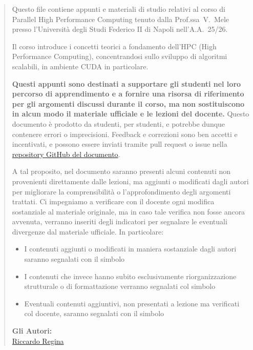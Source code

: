 \begin{abstract}
  Questo file contiene appunti e materiali di studio relativi al corso di Parallel High Performance Computing tenuto dalla Prof.ssa~V.~Mele presso l'Università degli Studi Federico II di Napoli nell'A.A.~25/26.
  
  Il corso introduce i concetti teorici a fondamento dell'HPC (High Performance Computing), concentrandosi sullo sviluppo di algoritmi scalabili, in ambiente CUDA in particolare.

  \textbf{Questi appunti sono destinati a supportare gli studenti nel loro percorso di apprendimento e a fornire una risorsa di riferimento per gli argomenti discussi durante il corso, ma non sostituiscono in alcun modo il materiale ufficiale e le lezioni del docente.}
  Questo documento è prodotto da studenti, per studenti, e potrebbe dunque contenere errori o imprecisioni. Feedback e correzioni sono ben accetti e incentivati, e possono essere inviati tramite pull request o issue nella \href{https://github.com/riccardoregina/HPC-notes}{repository GitHub del documento}.

  A tal proposito, nel documento saranno presenti alcuni contenuti non provenienti direttamente dalle lezioni, ma aggiunti o modificati dagli autori per migliorare la comprensibilità o l'approfondimento degli argomenti trattati.
  Ci impegniamo a verificare con il docente ogni modifica sostanziale al materiale originale, ma in caso tale verifica non fosse ancora avvenuta, verranno inseriti degli indicatori per segnalare le eventuali divergenze dal materiale ufficiale.
  In particolare:
  \begin{itemize}
    \item I contenuti aggiunti o modificati in maniera sostanziale dagli autori saranno segnalati con il simbolo \warningsymbol{}
    \item I contenuti che invece hanno subito esclusivamente riorganizzazione strutturale o di formattazione verranno segnalati col simbolo \infosymbol{}
    \item Eventuali contenuti aggiuntivi, non presentati a lezione ma verificati col docente, saranno segnalati con il simbolo \extrasymbol{}
  \end{itemize}
  
  \begin{flushright}
    \vspace{2cm}
    \textbf{Gli Autori:}\\
    \href{https://github.com/riccardoregina}{Riccardo Regina} \\
  \end{flushright}
\end{abstract}
